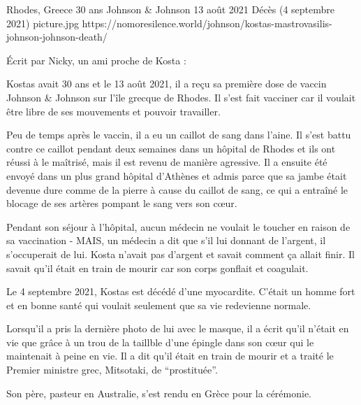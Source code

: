{Rhodes, Greece}
{30 ans}
{Johnson \& Johnson}
{13 août 2021}
{Décès (4 septembre 2021)}
{picture.jpg}
{https://nomoresilence.world/johnson/kostas-mastrovasilis-johnson-johnson-death/}
{

Écrit par Nicky, un ami proche de Kosta :

Kostas avait 30 ans et le 13 août 2021, il a reçu sa première dose de vaccin
Johnson \& Johnson sur l'île grecque de Rhodes. Il s'est fait vacciner car il
voulait être libre de ses mouvements et pouvoir travailler.

Peu de temps après le vaccin, il a eu un caillot de sang dans l'aine. Il s'est
battu contre ce caillot pendant deux semaines dans un hôpital de Rhodes et ils
ont réussi à le maîtrisé, mais il est revenu de manière agressive. Il a ensuite
été envoyé dans un plus grand hôpital d'Athènes et admis parce que sa jambe
était devenue dure comme de la pierre à cause du caillot de sang, ce qui a
entraîné le blocage de ses artères pompant le sang vers son cœur.

Pendant son séjour à l'hôpital, aucun médecin ne voulait le toucher en raison de
sa vaccination - MAIS, un médecin a dit que s'il lui donnant de l'argent, il
s'occuperait de lui. Kosta n'avait pas d'argent et savait comment ça allait
finir. Il savait qu'il était en train de mourir car son corps gonflait et
coagulait.

Le 4 septembre 2021, Kostas est décédé d'une myocardite. C'était un homme fort
et en bonne santé qui voulait seulement que sa vie redevienne normale.

Lorsqu'il a pris la dernière photo de lui avec le masque, il a écrit qu'il
n'était en vie que grâce à un trou de la taillble d'une épingle dans son cœur
qui le maintenait à peine en vie. Il a dit qu'il était en train de mourir et a
traité le Premier ministre grec, Mitsotaki, de “prostituée”.

Son père, pasteur en Australie, s'est rendu en Grèce pour la cérémonie.

}
